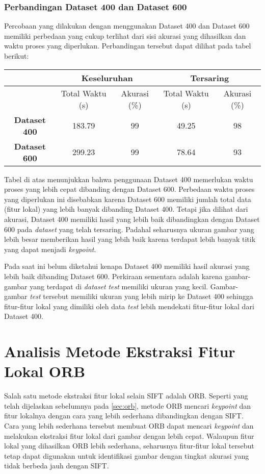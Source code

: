 \subsubsection{Perbandingan Dataset 400 dan Dataset 600}
Percobaan yang dilakukan dengan menggunakan Dataset 400 dan Dataset 600 memiliki perbedaan yang cukup terlihat dari sisi akurasi yang dihasilkan dan waktu proses yang diperlukan. Perbandingan tersebut dapat dilihat pada tabel berikut:
\begin{table}[H]
	\centering
	\begin{tabular}{|c|c|c|c|c|} 
		\hline
		& \multicolumn{2}{c|}{\textbf{Keseluruhan}}   & \multicolumn{2}{c|}{\textbf{Tersaring}}       \\ 
		\hline
		& Total Waktu (s) & Akurasi (\%) & Total Waktu (s) & Akurasi (\%)  \\ 
		\hline
		\textbf{Dataset 400} & 183.79               & 99           & 49.25               & 98            \\ 
		\hline
		\textbf{Dataset 600} & 299.23               & 99           & 78.64               & 93            \\
		\hline
	\end{tabular}
\end{table}

Tabel di atas menunjukkan bahwa penggunaan Dataset 400 memerlukan waktu proses yang lebih cepat dibanding dengan Dataset 600. Perbedaan waktu proses yang diperlukan ini disebabkan karena Dataset 600 memiliki jumlah total data (fitur lokal) yang lebih banyak dibanding Dataset 400. Tetapi jika dilihat dari akurasi, Dataset 400 memiliki hasil yang lebih baik dibandingkan dengan Dataset 600 pada \textit{dataset} yang telah tersaring. Padahal seharusnya ukuran gambar yang lebih besar memberikan hasil yang lebih baik karena terdapat lebih banyak titik yang dapat menjadi \textit{keypoint}. 

Pada saat ini belum diketahui kenapa Dataset 400 memiliki hasil akurasi yang lebih baik dibanding Dataset 600. Perkiraan sementara adalah karena gambar-gambar yang terdapat di \textit{dataset} \textit{test} memiliki ukuran yang kecil. Gambar-gambar \textit{test} tersebut memiliki ukuran yang lebih mirip ke Dataset 400 sehingga fitur-fitur lokal yang dimiliki oleh data \textit{test} lebih mendekati fitur-fitur lokal dari Dataset 400.

\section{Analisis Metode Ekstraksi Fitur Lokal ORB}
\label{sec:analisis_orb}
Salah satu metode ekstraksi fitur lokal selain SIFT adalah ORB. Seperti yang telah dijelaskan sebelumnya pada \ref{sec:orb}, metode ORB mencari \textit{keypoint} dan fitur lokalnya dengan cara yang lebih sederhana dibandingkan dengan SIFT. Cara yang lebih sederhana tersebut membuat ORB dapat mencari \textit{keypoint} dan melakukan ekstraksi fitur lokal dari gambar dengan lebih cepat. Walaupun fitur lokal yang dihasilkan ORB lebih sederhana, seharusnya fitur-fitur lokal tersebut tetap dapat digunakan untuk identifikasi gambar dengan tingkat akurasi yang tidak berbeda jauh dengan SIFT.

